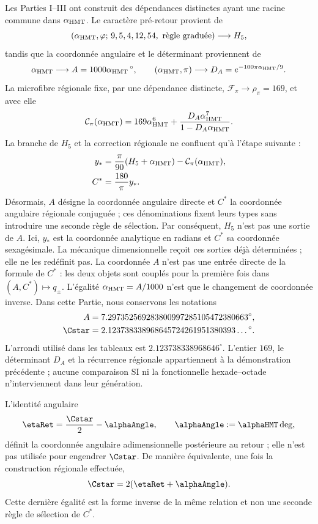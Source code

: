 Les Parties I--III ont construit des dépendances distinctes ayant une racine commune dans
\(\alpha_{\rm HMT}\). Le caractère pré-retour provient de
\[
(\alpha_{\rm HMT},\varphi;\,9,5,4,12,54,\text{ règle graduée})
\longrightarrow H_5,
\]
tandis que la coordonnée angulaire et le déterminant proviennent de
\[
\alpha_{\rm HMT}\longrightarrow
A=1000\alpha_{\rm HMT}\,{}^\circ,
\qquad
(\alpha_{\rm HMT},\pi)\longrightarrow
D_A=e^{-100\pi\alpha_{\rm HMT}/9}.
\]
La microfibre régionale fixe, par une dépendance distincte,
\(\mathcal F_\pi\to\rho_\pi=169\), et avec elle
\[
\mathcal C_\pi(\alpha_{\rm HMT})
=169\alpha_{\rm HMT}^{6}
+\frac{D_A\alpha_{\rm HMT}^{7}}
       {1-D_A\alpha_{\rm HMT}}.
\]
La branche de \(H_5\) et la correction régionale ne confluent qu'à l'étape
suivante :
\[
\begin{aligned}
y_*&=\frac{\pi}{90}(H_5+\alpha_{\rm HMT})
     -\mathcal C_\pi(\alpha_{\rm HMT}),\\
C^*&=\frac{180}{\pi}y_*.
\end{aligned}
\]
Désormais, \(A\) désigne la coordonnée angulaire directe et \(C^*\) la
coordonnée angulaire régionale conjuguée ; ces dénominations fixent leurs types
sans introduire une seconde règle de sélection.
Par conséquent, \(H_5\) n'est pas une sortie de \(A\). Ici, \(y_*\) est la coordonnée
analytique en radians et \(C^*\) sa coordonnée sexagésimale. La mécanique
dimensionnelle reçoit ces sorties déjà déterminées ; elle ne les redéfinit pas.
La coordonnée \(A\) n'est pas une entrée directe de la formule de \(C^*\) : les deux
objets sont couplés pour la première fois dans \((A,C^*)\mapsto q_\pm\). L'égalité
\(\alpha_{\rm HMT}=A/1000\) n'est que le changement de coordonnée inverse.
Dans cette Partie, nous conservons les notations
\[
\begin{aligned}
 A&=7.297352569283800997285105472380663^\circ,\\
 \Cstar&=2.123738338968645724261951380393\ldots{}^\circ.
\end{aligned}
\]
L'arrondi utilisé dans les tableaux est
\(2.123738338968646^\circ\). L'entier \(169\), le déterminant \(D_A\) et
la récurrence régionale appartiennent à la démonstration précédente ; aucune
comparaison SI ni la fonctionnelle hexade--octade n'interviennent dans leur génération.

L'identité
angulaire
\[
 \etaRet=\frac{\Cstar}{2}-\alphaAngle,
 \qquad
 \alphaAngle:=\alphaHMT\,{\rm deg},
\]
définit la coordonnée angulaire adimensionnelle postérieure au retour ; elle n'est pas utilisée
pour engendrer \(\Cstar\). De manière équivalente,
une fois la construction régionale effectuée,
\[
 \Cstar=2(\etaRet+\alphaAngle).
\]
Cette dernière égalité est la forme inverse de la même relation et non une
seconde règle de sélection de \(C^*\).

